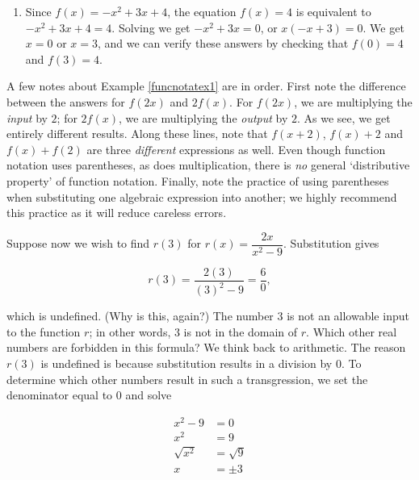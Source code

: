 {\begin{enumerate}
\begin{enumerate}
From our work above, we see $f(2) = 6$ so that

\[ \begin{array}{rclr}  
f(x) + f(2) & = & \left(-x^2 + 3x + 4\right) + 6  & \\
            & = & -x^2 + 3x + 10 \\ 
            \end{array} \]

\end{enumerate}

\item   Since $f(x) = -x^2 + 3x + 4$, the equation $f(x) = 4$ is equivalent to $-x^2+3x+4 = 4$. Solving we get $-x^2+3x = 0$, or $x(-x+3) = 0$.  We get $x=0$ or $x=3$, and we can verify these answers by checking that $f(0) = 4$ and $f(3) = 4$.   

\end{enumerate}
}

\pagebreak

A few notes about Example \ref{funcnotatex1} are in order.  First note the difference between the answers for $f(2x)$ and $2f(x)$.  For $f(2x)$, we are multiplying the \textit{input} by $2$;  for $2 f(x)$, we are multiplying the \textit{output} by $2$.  As we see, we get entirely different results.  Along these lines, note that $f(x+2)$, $f(x) + 2$ and $f(x) + f(2)$ are three \textit{different} expressions as well.  Even though function notation uses parentheses, as does multiplication, there is \textit{no} general `distributive property' of function notation. Finally, note the practice of using parentheses when substituting one algebraic expression into another;  we highly recommend this practice as it will reduce careless errors. 

\smallskip


Suppose now we wish to find $r(3)$ for $r(x) = \dfrac{2x}{x^2 - 9}$.  Substitution gives

\[
r(3) = \dfrac{2(3)}{(3)^2-9} = \dfrac{6}{0},
\]

which is undefined. (Why is this, again?) The number $3$ is not an allowable input to the function $r$;  in other words, $3$ is not in the domain of $r$.  Which other real numbers are forbidden in this formula?  We think back to arithmetic.  The reason $r(3)$ is undefined is because substitution results in a division by $0$.  To determine which other numbers result in such a transgression, we set the denominator equal to $0$ and solve

\begin{align*}
x^2 - 9 & =  0   \\
x^2 & =  9  \\
\sqrt{x^2} & =  \sqrt{9}  \tag*{extract square roots}  \\
x & =  \pm 3 
\end{align*}

